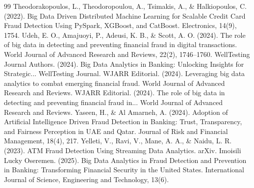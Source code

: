 \documentclass[11pt,a4paper]{article}
\begin{document}
\begin{thebibliography}{99}
 Theodorakopoulos, L., Theodoropoulou, A., Tsimakis, A., \& Halkiopoulos, C. (2022). Big Data Driven Distributed Machine Learning for Scalable Credit Card Fraud Detection Using PySpark, XGBoost, and CatBoost. Electronics, 14(9), 1754.
 Udeh, E. O., Amajuoyi, P., Adeusi, K. B., \& Scott, A. O. (2024). The role of big data in detecting and preventing financial fraud in digital transactions. World Journal of Advanced Research and Reviews, 22(2), 1746--1760.
 WellTesting Journal Authors. (2024). Big Data Analytics in Banking: Unlocking Insights for Strategic... WellTesting Journal.
 WJARR Editorial. (2024). Leveraging big data analytics to combat emerging financial fraud. World Journal of Advanced Research and Reviews.
 WJARR Editorial. (2024). The role of big data in detecting and preventing financial fraud in... World Journal of Advanced Research and Reviews.
 Yaseen, H., \& Al Amarneh, A. (2024). Adoption of Artificial Intelligence Driven Fraud Detection in Banking: Trust, Transparency, and Fairness Perception in UAE and Qatar. Journal of Risk and Financial Management, 18(4), 217.
 Yelleti, V., Ravi, V., Mane, A. A., \& Naidu, L. R. (2023). ATM Fraud Detection Using Streaming Data Analytics. arXiv.
 Imoisili Lucky Oseremen. (2025). Big Data Analytics in Fraud Detection and Prevention in Banking: Transforming Financial Security in the United States. International Journal of Science, Engineering and Technology, 13(6).
\end{thebibliography}
\end{document}
